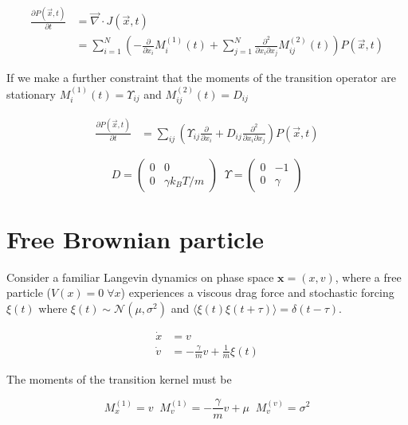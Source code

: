 \documentclass{article}
\begin{document}
\begin{align}
\frac{\partial P(\vec{x},t)}{\partial t}  &= \vec{\nabla} \cdot J(\vec{x},t)\\
&= \sum_{i=1}^{N}\left(-\frac{\partial}{\partial x_{i}}M_{i}^{(1)}(t) + \sum_{j=1}^{N} \frac{\partial^{2}}{\partial x_{i}\partial x_{j}}M_{ij}^{(2)}(t)\right)P(\vec{x},t)
\end{align}

If we make a further constraint that the moments of the transition operator are stationary $M_{i}^{(1)}(t) = \Upsilon_{ij}$ and $M_{ij}^{(2)}(t) = D_{ij}$ 

\begin{align}
\frac{\partial P(\vec{x},t)}{\partial t}  &= \sum_{ij}\left(\Upsilon_{ij}\frac{\partial}{\partial x_{i}} + D_{ij}\frac{\partial^{2}}{\partial x_{i}\partial x_{j}}\right)P(\vec{x},t)
\end{align}

\begin{equation*}
D = \begin{pmatrix}0&0 \\ 0& \gamma k_{B}T/m \end{pmatrix}\;\;\Upsilon = \begin{pmatrix}0 & -1\\ 0 & \gamma\end{pmatrix}
\end{equation*}

\section{Free Brownian particle}

Consider a familiar Langevin dynamics on phase space $\bm{x} = (x,v)$, where a free particle ($V(x)=0\; \forall x$) experiences a viscous drag force and stochastic forcing $\xi(t)$ where $\xi(t)\sim\mathcal{N}(\mu,\sigma^{2})$ and $\langle \xi(t)\xi(t+\tau)\rangle = \delta(t-\tau)$. 

\begin{align*}
\dot{x} &= v\\
\dot{v} &= -\frac{\gamma}{m}v + \frac{1}{m}\xi(t)
\end{align*}

The moments of the transition kernel must be

\begin{equation*}
M_{x}^{(1)} = v  \;\; M_{v}^{(1)} = -\frac{\gamma}{m}v + \mu \;\; M_{v}^{(v)} = \sigma^{2}
\end{equation*}
\end{document}
